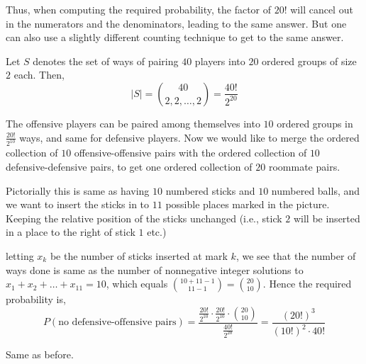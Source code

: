 Thus, when computing the required probability, the factor of $20!$ will cancel
out in the numerators and the denominators, leading to the same answer. But one
can also use a slightly different counting technique to get to the same answer.
\begin{solution}
    Let $S$ denotes the set of ways of pairing $40$ players into $20$ ordered
groups of size $2$ each. Then,
\begin{equation*}
    \vert S \vert = {{40} \choose {2, 2, \dots, 2}} = \frac{40!}{2^{20}}
\end{equation*}

    The offensive players can be paired among themselves into $10$ ordered
groups in $\frac{20!}{2^{10}}$ ways, and same for defensive players. Now we
would like to merge the ordered collection of $10$ offensive-offensive pairs
with the ordered collection of $10$ defensive-defensive pairs, to get one
ordered collection of $20$ roommate pairs. 

    Pictorially this is same as having $10$ numbered sticks and $10$ numbered
balls, and we want to insert the sticks in to $11$ possible places marked in
the picture. Keeping the relative position of the sticks unchanged (i.e., stick
$2$ will be inserted in a place to the right of stick $1$ etc.)
\begin{figure}[H]
    \centering
    
\end{figure}
letting $x_k$ be the number of sticks inserted at mark $k$, we see that the
number of ways done is same as the number of nonnegative integer solutions to
$x_1 + x_2 + \dots + x_{11} = 10$, which equals ${{10 + 11 - 1} \choose {11 -
1}} = {20 \choose 10}$. Hence the required probability is,
\begin{equation*}
    P(\text{no defensive-offensive pairs}) 
    = \frac{\frac{20!}{2^{10}} \cdot
            \frac{20!}{2^{10}} \cdot
            {20 \choose 10}}
           {\frac{40!}{2^{20}}}
    = \frac{(20!)^3}{(10!)^2 \cdot 40!}
\end{equation*}

    Same as before.
\end{solution}